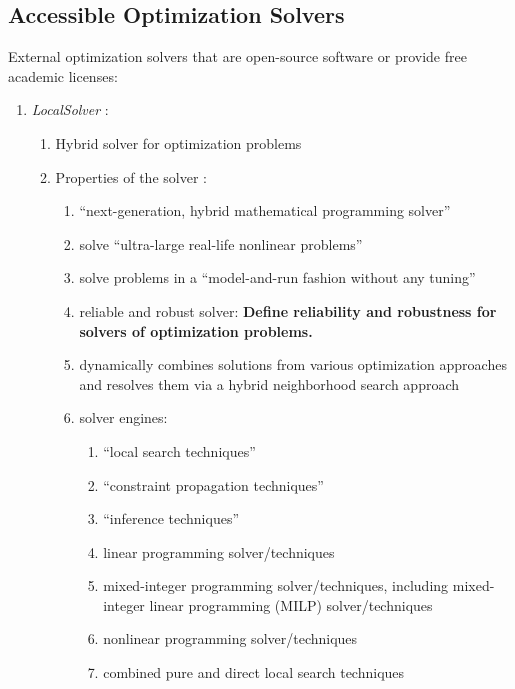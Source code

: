 \subsection{Accessible Optimization Solvers}
\label{ssec:AccessibleOptimizationSolvers}

External optimization solvers that are open-source software or provide free academic licenses: \vspace{-0.3cm}
\begin{enumerate} \itemsep -4pt
\item {\it LocalSolver} \cite{Innovation24Staff2015}: \vspace{-0.3cm}
	\begin{enumerate} \itemsep -2pt
	\item Hybrid solver for optimization problems
	\item Properties of the solver \cite[Product: Overview]{Innovation24Staff2015}: \vspace{-0.2cm}
		\begin{enumerate} \itemsep -2pt
		\item ``next-generation, hybrid mathematical programming solver''
		\item solve ``ultra-large real-life nonlinear problems''
		\item solve problems in a ``model-and-run fashion without any tuning''
		\item reliable and robust solver: {\bf Define reliability and robustness for solvers of optimization problems.}
		\item dynamically combines solutions from various optimization approaches and resolves them via a hybrid neighborhood search approach
		\item solver engines: \vspace{-0.1cm}
			\begin{enumerate} \itemsep -1pt
			\item ``local search techniques''
			\item ``constraint propagation techniques''
			\item ``inference techniques''
			\item linear programming solver/techniques
			\item mixed-integer programming solver/techniques, including mixed-integer linear programming (MILP) solver/techniques
			\item nonlinear programming solver/techniques
			\item combined pure and direct local search techniques

\end{enumerate}
\end{enumerate}
\end{enumerate}
\end{enumerate}
